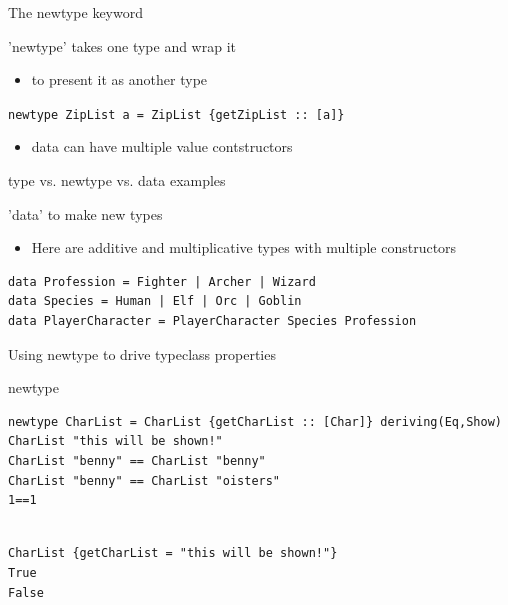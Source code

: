 \documentclass[presetation]{beamer}
\begin{document}
\begin{frame}[fragile,label={sec:orgb0dd56a}]{The newtype keyword}
 \begin{block}{'newtype' takes one type and wrap it}
\begin{itemize}
\item to present it as another type
\end{itemize}
\texttt{newtype ZipList a = ZipList \{getZipList :: [a]\}}
\begin{itemize}
\item data can have multiple value contstructors
\end{itemize}
\end{block}
\end{frame}
\begin{frame}[fragile,label={sec:orga458e21}]{type vs. newtype vs. data examples}
 \begin{block}{'data' to make new types}
\begin{itemize}
\item Here are additive and multiplicative types with multiple constructors
\end{itemize}
\begin{verbatim}
data Profession = Fighter | Archer | Wizard
data Species = Human | Elf | Orc | Goblin
data PlayerCharacter = PlayerCharacter Species Profession
\end{verbatim}
\end{block}
\end{frame}

\begin{frame}[fragile,label={sec:org56db37b}]{Using newtype to drive typeclass properties}
 \begin{block}{newtype}
\begin{verbatim}
newtype CharList = CharList {getCharList :: [Char]} deriving(Eq,Show)
CharList "this will be shown!"
CharList "benny" == CharList "benny"
CharList "benny" == CharList "oisters"
1==1
\end{verbatim}

\begin{verbatim}

CharList {getCharList = "this will be shown!"}
True
False
\end{verbatim}
\end{block}
\end{frame}
\end{document}
